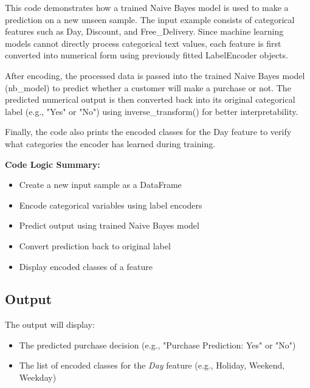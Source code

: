 \documentclass[11pt,a4paper]{report}
\begin{document}
This code demonstrates how a trained Naive Bayes model is used to make a prediction on a new unseen sample. The input example consists of categorical features such as Day, Discount, and Free\_Delivery. Since machine learning models cannot directly process categorical text values, each feature is first converted into numerical form using previously fitted LabelEncoder objects.

After encoding, the processed data is passed into the trained Naive Bayes model (nb\_model) to predict whether a customer will make a purchase or not. The predicted numerical output is then converted back into its original categorical label (e.g., "Yes" or "No") using inverse\_transform() for better interpretability.

Finally, the code also prints the encoded classes for the Day feature to verify what categories the encoder has learned during training.

\textbf{Code Logic Summary:}
\begin{itemize}
\item Create a new input sample as a DataFrame
\item Encode categorical variables using label encoders
\item Predict output using trained Naive Bayes model
\item Convert prediction back to original label
\item Display encoded classes of a feature
\end{itemize}

\subsection*{Output}

The output will display:
\begin{itemize}
\item The predicted purchase decision (e.g., "Purchase Prediction: Yes" or "No")
\item The list of encoded classes for the \textit{Day} feature (e.g., {Holiday, Weekend, Weekday})
\end{itemize}
\end{document}
